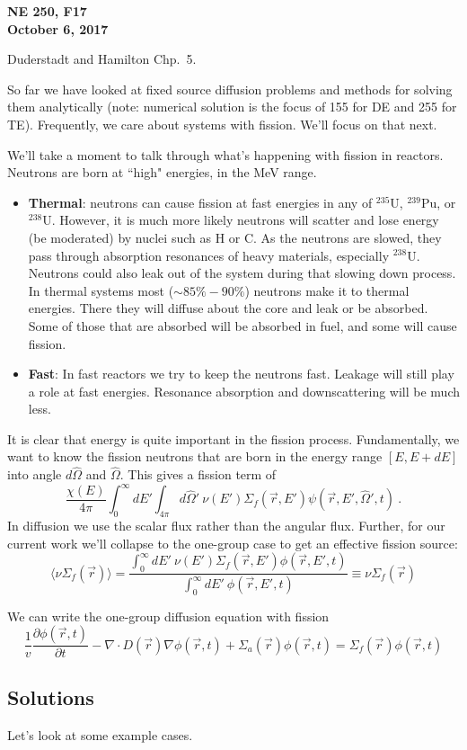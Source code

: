 \documentclass[12pt]{article}
\newcommand{\vOmega}{\ensuremath{\hat{\Omega}}}
\begin{document}
\begin{center}
{\bf NE 250, F17\\
October 6, 2017 
}
\end{center}

Duderstadt and Hamilton Chp.\ 5.

So far we have looked at fixed source diffusion problems and methods for solving them analytically (note: numerical solution is the focus of 155 for DE and 255 for TE). Frequently, we care about systems with fission. We'll focus on that next.

We'll take a moment to talk through what's happening with fission in reactors. Neutrons are born at ``high" energies, in the MeV range. 
\begin{itemize}
\item \textbf{Thermal}: neutrons can cause fission at fast energies in any of $^{235}$U, $^{239}$Pu, or $^{238}$U. However, it is much more likely neutrons will scatter and lose energy (be moderated) by nuclei such as H or C. As the neutrons are slowed, they pass through absorption resonances of heavy  materials, especially $^{238}$U. Neutrons could also leak out of the system during that slowing down process. In thermal systems most ($\sim 85\%-90\%$) neutrons make it to thermal energies. There they will diffuse about the core and leak or be absorbed. Some of those that are absorbed will be absorbed in fuel, and some will cause fission.

\item \textbf{Fast}: In fast reactors we try to keep the neutrons fast. Leakage will still play a role at fast energies. Resonance absorption and downscattering will be much less. 
\end{itemize}
%
It is clear that energy is quite important in the fission process. Fundamentally, we want to know the fission neutrons that are born in the energy range $[E, E+dE]$ into angle $d\vOmega$ and $\vOmega$. This gives a fission term of 
\[
\frac{\chi(E)}{4\pi} \int_0^{\infty} dE' \int_{4\pi} d\vOmega' \: \nu(E') \Sigma_f(\vec{r}, E') \psi(\vec{r}, E', \vOmega', t) \:.  
\] 
In diffusion we use the scalar flux rather than the angular flux. Further, for our current work we'll collapse to the one-group case to get an effective fission source:
\[
\langle \nu \Sigma_f (\vec{r}) \rangle = \frac{\int_0^{\infty} dE'\: \nu(E') \Sigma_f(\vec{r}, E') \phi(\vec{r}, E', t)} {\int_0^{\infty} dE'\: \phi(\vec{r}, E', t)} \equiv \nu \Sigma_f (\vec{r}) 
\]

We can write the one-group diffusion equation with fission
\begin{equation}
\frac{1}{v} \frac{\partial \phi(\vec{r}, t)}{\partial t} - \nabla \cdot D(\vec{r}) \nabla	\phi(\vec{r}, t) + \Sigma_a(\vec{r}) \phi(\vec{r}, t) = \Sigma_f (\vec{r})\phi(\vec{r}, t)
\end{equation}

\subsection*{Solutions}
Let's look at some example cases. 
\end{document}

